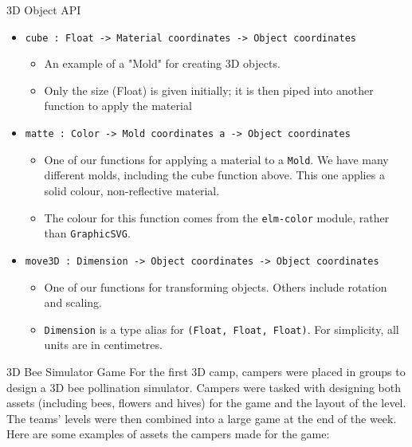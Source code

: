 \documentclass[22pt]{beamer}
\begin{document}
\begin{frame}[fragile]
\begin{textblock}{7.25}
\begin{block}{3D Object API}
\begin{itemize}
    \item \texttt{cube : Float -> Material coordinates -> Object coordinates} 
    \begin{itemize}
        \item An example of a "Mold" for creating 3D objects. 
        \item Only the size (Float) is given initially; it is then piped into another function to apply the material
    \end{itemize}
    \item \texttt{matte : Color -> Mold coordinates a -> Object coordinates} 
    \begin{itemize}
        \item One of our functions for applying a material to a \texttt{Mold}. We have many different molds, including the cube function above. This one applies a solid colour, non-reflective material.
        \item The colour for this function comes from the \texttt{elm-color} module, rather than \texttt{GraphicSVG}.
    \end{itemize}
    \item \texttt{move3D : Dimension -> Object coordinates -> Object coordinates } 
    \begin{itemize}
        \item One of our functions for transforming objects. Others include rotation and scaling.
        \item \texttt{Dimension} is a type alias for \texttt{(Float, Float, Float)}. For simplicity, all units are in centimetres.
    \end{itemize}
\end{itemize}

\end{block}

\begin{block}{3D Bee Simulator Game}
For the first 3D camp, campers were placed in groups to design a 3D bee pollination simulator. Campers
were tasked with designing both assets (including bees, flowers and hives) for the game and the layout of 
the level. The teams' levels were then combined into a large game at the end of the week.
Here are some examples of assets the campers made for the game:


\end{block}
\end{textblock}
\end{frame}
\end{document}

